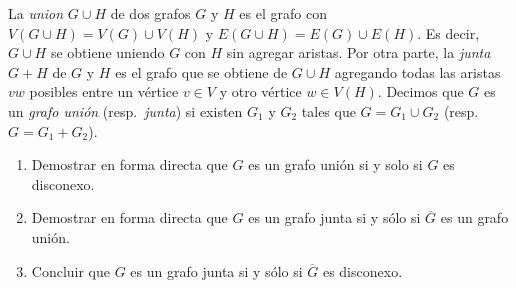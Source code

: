 

\item La \emph{union} $G \cup H$ de dos grafos $G$ y $H$ es el grafo con $V(G \cup H) = V(G) \cup V(H)$ y $E(G \cup H) = E(G) \cup E(H)$.  Es decir, $G \cup H$ se obtiene uniendo $G$ con $H$ sin agregar aristas.  Por otra parte, la \emph{junta} $G + H$ de $G$ y $H$ es el grafo que se obtiene de $G \cup H$ agregando todas las aristas $vw$ posibles entre un vértice $v \in V$ y otro vértice $w \in V(H)$.  Decimos que $G$ es un \emph{grafo unión} (resp.\ \emph{junta}) si existen $G_1$ y $G_2$ tales que $G = G_1 \cup G_2$ (resp.\ $G = G_1 + G_2$).
\begin{enumerate}[label=$\alph*)$,ref=$\alph*)$]
\item Demostrar en forma directa que $G$ es un grafo unión si y solo si $G$ es disconexo.
\item Demostrar en forma directa que $G$ es un grafo junta si y sólo si $\overline{G}$ es un grafo unión.
\item Concluir que $G$ es un grafo junta si y sólo si $\overline{G}$ es disconexo.
\end{enumerate}

